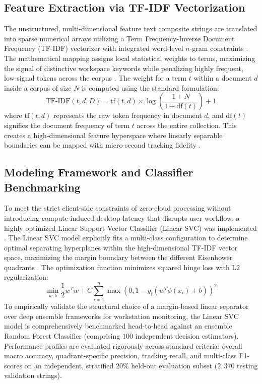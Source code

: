\documentclass[conference]{IEEEtran}
\begin{document}
\subsection{Feature Extraction via TF-IDF Vectorization}
The unstructured, multi-dimensional feature text composite strings are translated into sparse numerical arrays utilizing a Term Frequency-Inverse Document Frequency (TF-IDF) vectorizer with integrated word-level $n$-gram constraints \cite{Sitaula2022}. The mathematical mapping assigns local statistical weights to terms, maximizing the signal of distinctive workspace keywords while penalizing highly frequent, low-signal tokens across the corpus \cite{Sitaula2022}. The weight for a term $t$ within a document $d$ inside a corpus of size $N$ is computed using the standard formulation:
\begin{equation}
\text{TF-IDF}(t, d, D) = \text{tf}(t, d) \times \log \left( \frac{1 + N}{1 + \text{df}(t)} \right) + 1
\end{equation}
where $\text{tf}(t, d)$ represents the raw token frequency in document $d$, and $\text{df}(t)$ signifies the document frequency of term $t$ across the entire collection. This creates a high-dimensional feature hyperspace where linearly separable boundaries can be mapped with micro-second tracking fidelity \cite{Cahyani2021}.

\subsection{Modeling Framework and Classifier Benchmarking}
To meet the strict client-side constraints of zero-cloud processing without introducing compute-induced desktop latency that disrupts user workflow, a highly optimized Linear Support Vector Classifier (Linear SVC) was implemented \cite{Cahyani2021, MesaJimenez2022}. The Linear SVC model explicitly fits a multi-class configuration to determine optimal separating hyperplanes within the high-dimensional TF-IDF vector space, maximizing the margin boundary between the different Eisenhower quadrants \cite{Cahyani2021}. The optimization function minimizes squared hinge loss with L2 regularization:
\begin{equation}
\min_{w, b} \frac{1}{2} w^T w + C \sum_{i=1}^{n} \max(0, 1 - y_i (w^T \phi(x_i) + b))^2
\end{equation}
To empirically validate the structural choice of a margin-based linear separator over deep ensemble frameworks for workstation monitoring, the Linear SVC model is comprehensively benchmarked head-to-head against an ensemble Random Forest Classifier (comprising $100$ independent decision estimators). Performance profiles are evaluated rigorously across standard criteria: overall macro accuracy, quadrant-specific precision, tracking recall, and multi-class F1-scores on an independent, stratified $20\%$ held-out evaluation subset ($2,370$ testing validation strings).
\end{document}
